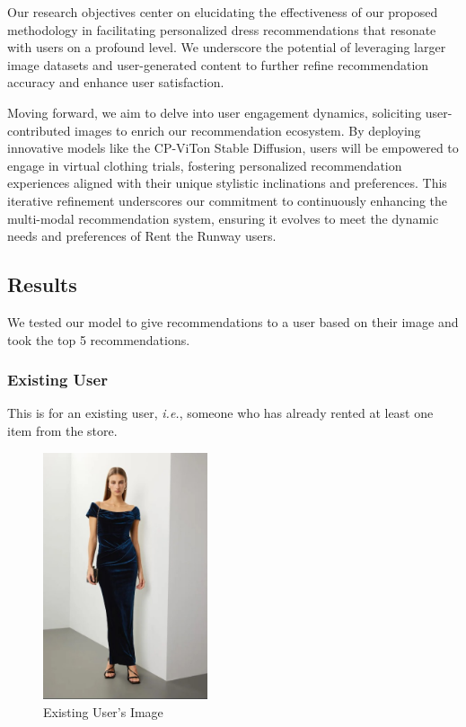\documentclass[conference]{IEEEtran}
\begin{document}
Our research objectives center on elucidating the effectiveness of our proposed methodology in facilitating personalized dress recommendations that resonate with users on a profound level. We underscore the potential of leveraging larger image datasets and user-generated content to further refine recommendation accuracy and enhance user satisfaction.

Moving forward, we aim to delve into user engagement dynamics, soliciting user-contributed images to enrich our recommendation ecosystem. By deploying innovative models like the CP-ViTon Stable Diffusion, users will be empowered to engage in virtual clothing trials, fostering personalized recommendation experiences aligned with their unique stylistic inclinations and preferences. This iterative refinement underscores our commitment to continuously enhancing the multi-modal recommendation system, ensuring it evolves to meet the dynamic needs and preferences of Rent the Runway users.
\subsection{Results}
We tested our model to give recommendations to a user based on their image and took the top 5 recommendations.
\subsubsection{Existing User}
This is for an existing user, \textit{i.e.}, someone who has already rented at least one item from the store.  
\begin{figure}[!htbp]
  \centering
  \includegraphics[width=0.4325\textwidth]{t1.jpg}
  \caption{Existing User's Image}
  \label{fig:User}
\end{figure}
\end{document}
